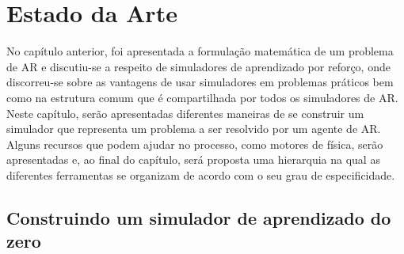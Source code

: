 \documentclass[cic,tc]{iiufrgs}
\begin{document}
%
%
%
%
%
%

\chapter{Estado da Arte}


No capítulo anterior, foi apresentada a formulação matemática de um problema de
AR e discutiu-se a respeito de simuladores de aprendizado por reforço, onde
discorreu-se sobre as vantagens de usar simuladores em problemas práticos bem
como na estrutura comum que é compartilhada por todos os simuladores de AR.
Neste capítulo, serão apresentadas diferentes maneiras de se construir um
simulador que representa um problema a ser resolvido por um agente de AR.
Alguns recursos que podem ajudar no processo, como motores de física, serão
apresentadas e, ao final do capítulo, será proposta uma hierarquia na qual as
diferentes ferramentas se organizam de acordo com o seu grau de especificidade.

\section{Construindo um simulador de aprendizado do zero}
\end{document}
